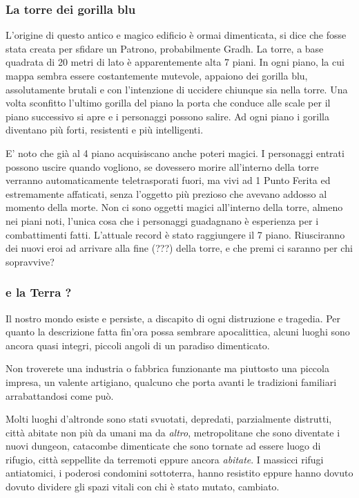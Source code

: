 \begin{multicols}{2}

\subsubsection{La torre dei gorilla blu}

L'origine di questo antico e magico edificio è ormai dimenticata, si dice che fosse stata creata per sfidare un Patrono, probabilmente Gradh. La torre, a base quadrata di 20 metri di lato è apparentemente alta 7 piani. In ogni piano, la cui mappa sembra essere costantemente mutevole, appaiono dei gorilla blu, assolutamente brutali e con l'intenzione di uccidere chiunque sia nella torre. Una volta sconfitto l'ultimo gorilla del piano la porta che conduce alle scale per il piano successivo si apre e i personaggi possono salire. Ad ogni piano i gorilla diventano più forti, resistenti e più intelligenti.

E' noto che già al 4 piano acquisiscano anche poteri magici. I personaggi entrati possono uscire quando vogliono, se dovessero morire all'interno della torre verranno automaticamente teletrasporati fuori, ma vivi ad 1 Punto Ferita ed estremamente affaticati, senza l'oggetto più prezioso che avevano addosso al momento della morte. Non ci sono oggetti magici all'interno della torre, almeno nei piani noti, l'unica cosa che i personaggi guadagnano è esperienza per i combattimenti fatti. L'attuale record è stato raggiungere il 7 piano. Riusciranno dei nuovi eroi ad arrivare alla fine (???) della torre, e che premi ci saranno per chi sopravvive?

\subsubsection{e la Terra ?}

Il nostro mondo esiste e persiste, a discapito di ogni distruzione e tragedia. Per quanto la descrizione fatta fin'ora possa sembrare apocalittica, alcuni luoghi sono ancora quasi integri, piccoli angoli di un paradiso dimenticato.

Non troverete una industria o fabbrica funzionante ma piuttosto una piccola impresa, un valente artigiano, qualcuno che porta avanti le tradizioni familiari arrabattandosi come può.

Molti luoghi d'altronde sono stati svuotati, depredati, parzialmente distrutti, città abitate non più da umani ma da \emph{altro}, metropolitane che sono diventate i nuovi dungeon, catacombe dimenticate che sono tornate ad essere luogo di rifugio, città seppellite da terremoti eppure ancora \emph{abitate}. I massicci rifugi antiatomici, i poderosi condomini sottoterra, hanno resistito eppure hanno dovuto dovuto dividere gli spazi vitali con chi è stato mutato, cambiato.


\end{multicols}
